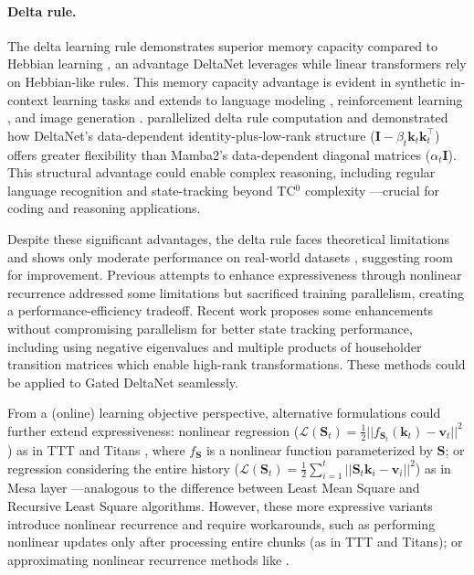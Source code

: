 \documentclass{article}
\def\rmI{{\mathbf{I}}}
\def\rmS{{\mathbf{S}}}
\def\vk{{\bm{k}}}
\def\vv{{\bm{v}}}
\begin{document}
\paragraph{Delta rule.} The delta learning rule demonstrates superior memory capacity compared to Hebbian learning \citep{Gardner1988TheSO, Prados1989NeuralNC}, an advantage DeltaNet leverages while linear transformers rely on Hebbian-like rules. This memory capacity advantage is evident in synthetic in-context learning tasks and extends to language modeling \citep{irie2021going, yang2024parallelizing}, reinforcement learning \citep{DBLP:conf/icml/IrieSCS22}, and image generation \citep{DBLP:conf/iclr/IrieS23}. \citet{yang2024parallelizing} parallelized delta rule computation and demonstrated how DeltaNet's data-dependent identity-plus-low-rank structure ($\rmI - \beta_t \vk_t \vk_t^\intercal$) offers greater flexibility than Mamba2's data-dependent diagonal matrices ($\alpha_t \rmI$). This structural advantage could enable complex reasoning, including regular language recognition \citep{fan-etal-2024-advancing, Grazzi2024UnlockingSI} and state-tracking beyond TC$^0$ complexity \citep{merrill_illusion_2024}—crucial for coding and reasoning applications.

Despite these significant advantages, the delta rule faces theoretical limitations \citep{irie-etal-2023-practical} and shows only moderate performance on real-world datasets \citep{yang2024parallelizing}, suggesting room for improvement. Previous attempts to enhance expressiveness through nonlinear recurrence \citep{irie2021going,DBLP:conf/icml/IrieSCS22} addressed some limitations but sacrificed training parallelism, creating a performance-efficiency tradeoff.
Recent work proposes some enhancements without compromising parallelism for better state tracking performance, including using negative eigenvalues \citep{Grazzi2024UnlockingSI} and multiple products of householder transition matrices \citep{siems2025deltaproductincreasingexpressivitydeltanet} which enable high-rank transformations. These methods could be applied to Gated DeltaNet seamlessly.

From a (online) learning objective perspective, alternative formulations could further extend expressiveness: nonlinear regression ($\mathcal{L}(\rmS_t) = \frac{1}{2}||f_{\rmS_t}(\vk_t) - \vv_t||^2$) as in TTT \citep{ttt} and Titans \citep{behrouz2024titanslearningmemorizetest}, where $f_\rmS$ is a nonlinear function parameterized by $\rmS$; or regression considering the entire history ($\mathcal{L}(\rmS_t) =\frac{1}{2} \sum_{i=1}^t||\rmS_t\vk_i - \vv_i||^2$) as in Mesa layer \citep{vonoswald2024uncoveringmesaoptimizationalgorithmstransformers}—analogous to the difference between Least Mean Square and Recursive Least Square algorithms. However, these more expressive variants introduce nonlinear recurrence and require workarounds, such as performing nonlinear updates only after processing entire chunks (as in TTT and Titans); or approximating nonlinear recurrence methods like \citet{lim2024parallelizingnonlinearsequentialmodels, gonzalez2024towards, schöne2025implicitlanguagemodelsrnns}.
\end{document}
